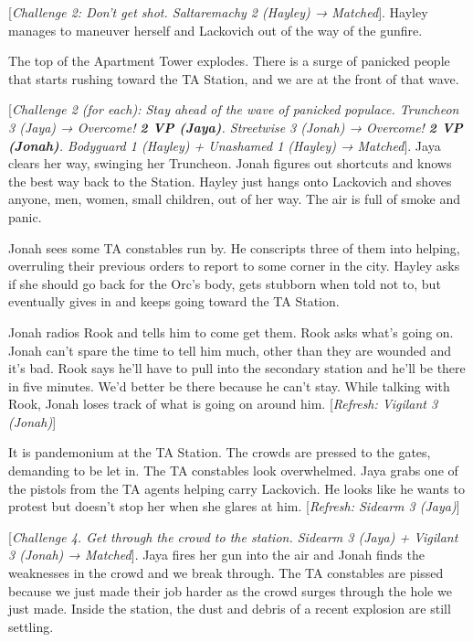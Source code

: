{[}\textit{Challenge 2: Don't get shot.  Saltaremachy 2 (Hayley) → Matched}{]}.  Hayley manages to maneuver herself and Lackovich out of the way of the gunfire.



The top of the Apartment Tower explodes.  There is a surge of panicked people that starts rushing toward the TA Station, and we are at the front of that wave.



{[}\textit{Challenge 2 (for each): Stay ahead of the wave of panicked populace.   Truncheon 3 (Jaya)  → Overcome! }\textit{\textbf{2 VP (Jaya)}}\textit{.  Streetwise 3  (Jonah) → Overcome! }\textit{\textbf{2 VP (Jonah)}}\textit{. Bodyguard 1 (Hayley) + Unashamed 1 (Hayley)  → Matched}{]}.  Jaya clears her way, swinging her Truncheon.  Jonah figures out shortcuts and knows the best way back to the Station.  Hayley just hangs onto Lackovich and shoves anyone, men, women, small children, out of her way.  The air is full of smoke and panic.



Jonah sees some TA constables run by.  He conscripts three of them into helping, overruling their previous orders to report to some corner in the city.  Hayley asks if she should go back for the Orc's body, gets stubborn when told not to, but eventually gives in and keeps going toward the TA Station.



Jonah radios Rook and tells him to come get them.  Rook asks what's going on.  Jonah can't spare the time to tell him much, other than they are wounded and it's bad.  Rook says he'll have to pull into the secondary station and he'll be there in five minutes.  We'd better be there because he can't stay.  While talking with Rook, Jonah loses track of what is going on around him.  {[}\textit{Refresh: Vigilant 3 (Jonah)}{]}



It is pandemonium at the TA Station.  The crowds are pressed to the gates, demanding to be let in.  The TA constables look overwhelmed.  Jaya grabs one of the pistols from the TA agents helping carry Lackovich.  He looks like he wants to protest but doesn't stop her when she glares at him. {[}\textit{Refresh: Sidearm 3 (Jaya)}{]}



{[}\textit{Challenge 4.  Get through the crowd to the station.  Sidearm 3 (Jaya) + Vigilant 3 (Jonah)  → Matched}{]}.  Jaya fires her gun into the air and Jonah finds the weaknesses in the crowd and we break through.  The TA constables are pissed because we just made their job harder as the crowd surges through the hole we just made.  Inside the station, the dust and debris of a recent explosion are still settling.



